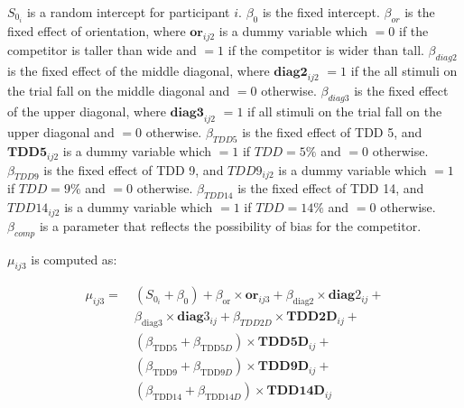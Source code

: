 $S_{0_i}$ is a random intercept for participant $i$. $\beta_{0}$ is the fixed intercept. $\beta_{or}$ is the fixed effect of orientation, where $\bm{or}_{ij2}$ is a dummy variable which $=0$ if the competitor is taller than wide and $=1$ if the competitor is wider than tall. $\beta_{diag2}$ is the fixed effect of the middle diagonal, where $\bm{diag2}_{ij2}$ $=1$ if the all stimuli on the trial fall on the middle diagonal and $=0$ otherwise. $\beta_{diag3}$ is the fixed effect of the upper diagonal, where $\bm{diag3}_{ij2}$ $=1$ if all stimuli on the trial fall on the upper diagonal and $=0$ otherwise. $\beta_{TDD5}$ is the fixed effect of TDD 5, and $\bm{TDD5}_{ij2}$ is a dummy variable which $=1$ if $TDD=5\%$ and $=0$ otherwise. $\beta_{TDD9}$ is the fixed effect of TDD 9, and $TDD9_{ij2}$ is a dummy variable which $=1$ if $TDD=9\%$ and $=0$ otherwise. $\beta_{TDD14}$ is the fixed effect of TDD 14, and $TDD14_{ij2}$ is a dummy variable which $=1$ if $TDD=14\%$ and $=0$ otherwise. $\beta_{comp}$ is a parameter that reflects the possibility of bias for the competitor.

$\mu_{ij3}$ is computed as:

\begin{equation}
    \begin{aligned}
    \mu_{ij3} =\ & (S_{0_i} + \beta_{0}) 
    + \beta_{\mathrm{or}} \times \bm{or}_{ij3} 
    + \beta_{\mathrm{diag}2} \times \bm{diag}2_{ij} +\\
    & \beta_{\mathrm{diag}3} \times \bm{diag}3_{ij} 
    + \beta_{TDD2D} \times \bm{TDD2D}_{ij} +\\
    & (\beta_{\mathrm{TDD}5} + \beta_{\mathrm{TDD}5D}) \times \bm{TDD5D}_{ij} +\\
    & (\beta_{\mathrm{TDD}9} + \beta_{\mathrm{TDD}9D}) \times \bm{TDD9D}_{ij} +\\
    & (\beta_{\mathrm{TDD}14} + \beta_{\mathrm{TDD}14D}) \times \bm{TDD14D}_{ij}
    \end{aligned}
    \label{circle_mu_eqn3}
\end{equation}


